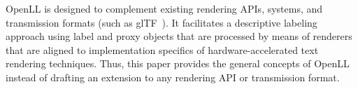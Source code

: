 \smallskip
\noindent
OpenLL is designed to complement existing rendering APIs, systems, and transmission formats (such as glTF~\cite{gltf}).
It facilitates a descriptive labeling approach using label and proxy objects that are processed by means of renderers that are aligned to implementation specifics of hardware-accelerated text rendering techniques.
Thus, this paper provides the general concepts of OpenLL instead of drafting an extension to any rendering API or transmission format.
